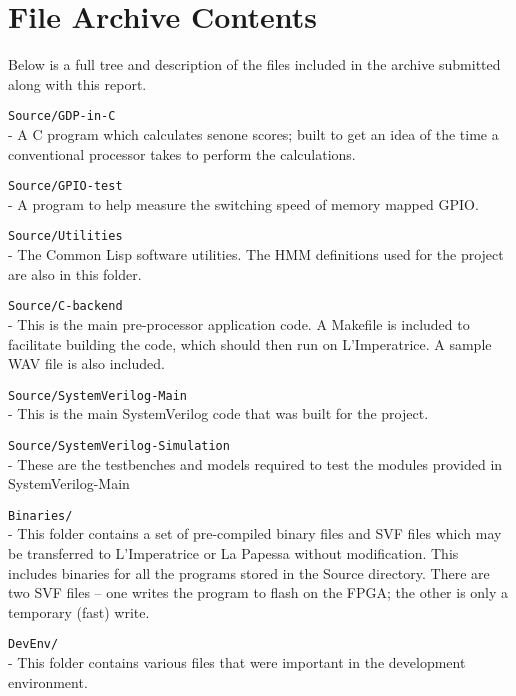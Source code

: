 \chapter{File Archive Contents} %
\label{apdx:archive_contents}

Below is a full tree and description of the files included in the archive submitted along with this report.





\texttt{Source/GDP-in-C} \\
- A C program which calculates senone scores; built to get an idea of the time a conventional processor takes to perform the calculations.

\texttt{Source/GPIO-test} \\
- A program to help measure the switching speed of memory mapped GPIO.

\texttt{Source/Utilities} \\
- The Common Lisp software utilities.  The HMM definitions used for the project are also in this folder.

\texttt{Source/C-backend} \\
- This is the main pre-processor application code.  A Makefile is included to facilitate building the code, which should then run on L'Imperatrice.  A sample WAV file is also included.

\texttt{Source/SystemVerilog-Main} \\
- This is the main SystemVerilog code that was built for the project.

\texttt{Source/SystemVerilog-Simulation} \\
- These are the testbenches and models required to test the modules provided in SystemVerilog-Main


\texttt{Binaries/} \\
- This folder contains a set of pre-compiled binary files and SVF files which may be transferred to L'Imperatrice or La Papessa without modification.  This includes binaries for all the programs stored in the Source directory.  There are two SVF files -- one writes the program to flash on the FPGA; the other is only a temporary (fast) write.


\texttt{DevEnv/} \\
- This folder contains various files that were important in the development environment.


